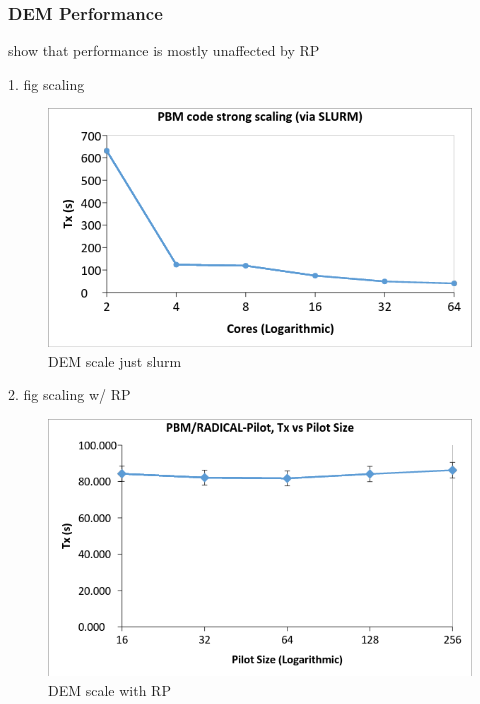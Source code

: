 \documentclass[preprint,11pt,authoryear]{elsarticle}
\begin{document}
    \subsubsection{DEM Performance}
    \par show that performance is mostly unaffected by RP 
    \par 1. fig scaling 
      \begin{figure}[H]
      \centering
      \includegraphics[scale=0.5]{rslts_strong_scale_slurm}
      \caption{ DEM scale just slurm }
      \label{fig:rslts_DEM_strong_scale}
      \end{figure}
    \par 2. fig scaling w/ RP  
      \begin{figure}[H]
      \centering
      \includegraphics[scale=0.5]{rslts_pbmbyrp_strng}
      \caption{ DEM scale with RP}
      \label{fig:rslts_dembyRP_strng}
      \end{figure}
      
 
\end{document}
